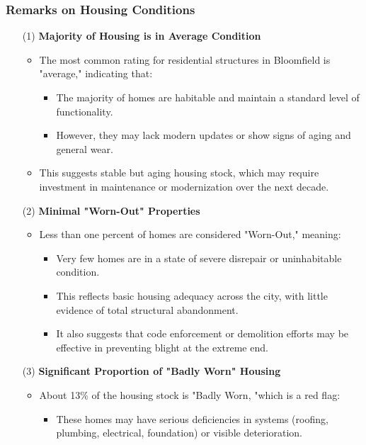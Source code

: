 \subsubsection*{Remarks on Housing Conditions}
\begin{itemize}
    \item [(1)] \textbf{\textcolor{coBalt}{Majority of Housing is in Average Condition}}
    \begin{itemize}
        \item The most common rating for residential structures in Bloomfield is "average," indicating that:
        \begin{itemize}
            \item The majority of homes are habitable and maintain a standard level of functionality.
            \item However, they may lack modern updates or show signs of aging and general wear.
        \end{itemize}
        \item This suggests stable but aging housing stock, which may require investment in maintenance or modernization over the next decade.
    \end{itemize}
    \item [(2)] \textbf{\textcolor{coBalt}{Minimal "Worn-Out" Properties}}
    \begin{itemize}
        \item Less than one percent of homes are considered "Worn-Out," meaning:
        \begin{itemize}
            \item Very few homes are in a state of severe disrepair or uninhabitable condition.
            \item This reflects basic housing adequacy across the city, with little evidence of total structural abandonment.
            \item It also suggests that code enforcement or demolition efforts may be effective in preventing blight at the extreme end.
        \end{itemize}
    \end{itemize}
    \item [(3)] \textbf{\textcolor{coBalt}{Significant Proportion of "Badly Worn" Housing}}
    \begin{itemize}
        \item About 13\% of the housing stock is "Badly Worn, "which is a red flag:
        \begin{itemize}
            \item These homes may have serious deficiencies in systems (roofing, plumbing, electrical, foundation) or visible deterioration.

\end{itemize}
\end{itemize}
\end{itemize}
